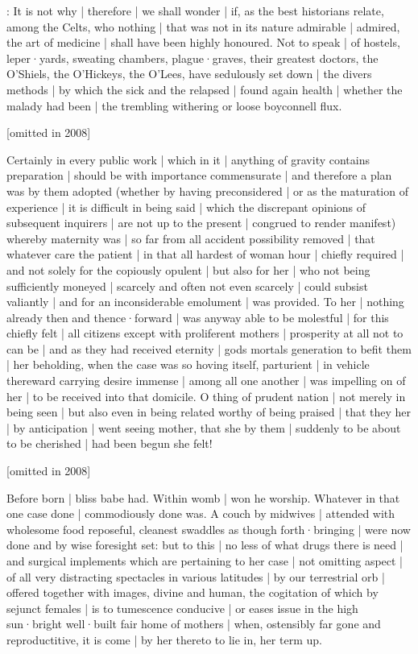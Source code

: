 
:
It is not why |
therefore |
we shall wonder |
if,
as the best historians relate,
among the Celts,
who nothing |
that was not in its nature admirable |
admired,
the art of medicine |
shall have been highly honoured.
Not to speak |
of hostels,
leper·yards,
sweating chambers,
plague·graves,
their greatest doctors,
the O'Shiels,
the O'Hickeys,
the O'Lees,
have sedulously set down |
the divers methods |
by which the sick and the relapsed |
found again health |
whether the malady had been |
the trembling withering or loose boyconnell flux.

[omitted in 2008]

Certainly in every public work |
which in it |
anything of gravity contains preparation |
should be with importance commensurate |
and therefore a plan was by them adopted
(whether by having preconsidered |
or as the maturation of experience |
it is difficult in being said |
which the discrepant opinions of subsequent inquirers |
are not up to the present |
congrued to render manifest)
whereby maternity was |
so far from all accident possibility removed |
that whatever care the patient |
in that all hardest of woman hour |
chiefly required |
and not solely for the copiously opulent |
but also for her |
who not being sufficiently moneyed |
scarcely and often not even scarcely |
could subsist valiantly |
and for an inconsiderable emolument |
was provided.
To her |
nothing already then and thence·forward |
was anyway able to be molestful |
for this chiefly felt |
all citizens except with proliferent mothers |
prosperity at all not to can be |
and as they had received eternity |
gods mortals generation to befit them |
her beholding,
when the case was so hoving itself,
parturient |
in vehicle thereward carrying desire immense |
among all one another |
was impelling on of her |
to be received into that domicile.
O thing of prudent nation |
not merely in being seen |
but also even in being related worthy of being praised |
that they her |
by anticipation |
went seeing mother,
that she by them |
suddenly to be about to be cherished |
had been begun she felt!



[omitted in 2008]

Before born |
bliss babe had.
Within womb |
won he worship.
Whatever in that one case done |
commodiously done was.
A couch by midwives |
attended with wholesome food reposeful,
cleanest swaddles as though forth·bringing |
were now done and by wise foresight set:
but to this |
no less of what drugs there is need |
and surgical implements which are pertaining to her case |
not omitting aspect |
of all very distracting spectacles in various latitudes |
by our terrestrial orb |
offered together with images,
divine and human,
the cogitation of which by sejunct females |
is to tumescence conducive |
or eases issue in the high sun·bright well·built fair home of mothers |
when,
ostensibly far gone and reproductitive,
it is come |
by her thereto to lie in,
her term up.

